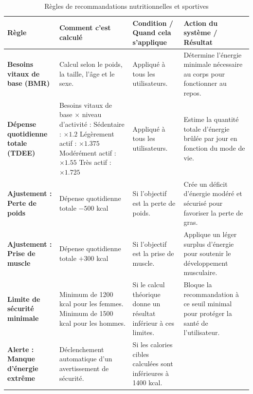 ﻿\documentclass[a4paper,12pt]{report}
\begin{document}
\begin{table}[H]
\sloppy
\centering
\caption{Règles de recommandations nutritionnelles et sportives}
\label{tab:regles_calcul_energetique_recommandations}
\scriptsize
\renewcommand{\arraystretch}{1.25}
\setlength{\tabcolsep}{3pt}
\begin{tabularx}{\textwidth}{|>{\RaggedRight\arraybackslash}p{2.8cm}|>{\RaggedRight\arraybackslash}p{4.1cm}|>{\RaggedRight\arraybackslash}p{3.2cm}|>{\RaggedRight\arraybackslash}X|}
\hline
\textbf{Règle} & \textbf{Comment c'est calculé} & \textbf{Condition / Quand cela s'applique} & \textbf{Action du système / Résultat} \\
\hline
\textbf{Besoins vitaux de base (BMR)} &
Calcul selon le poids, la taille, l'âge et le sexe. &
Appliqué à tous les utilisateurs. &
Détermine l'énergie minimale nécessaire au corps pour fonctionner au repos. \\
\hline
\textbf{Dépense quotidienne totale (TDEE)} &
Besoins vitaux de base $\times$ niveau d'activité :\newline
\textbullet{} Sédentaire : $\times 1.2$\newline
\textbullet{} Légèrement actif : $\times 1.375$\newline
\textbullet{} Modérément actif : $\times 1.55$\newline
\textbullet{} Très actif : $\times 1.725$ &
Appliqué à tous les utilisateurs. &
Estime la quantité totale d'énergie brûlée par jour en fonction du mode de vie. \\
\hline
\textbf{Ajustement : Perte de poids} &
Dépense quotidienne totale $- 500$ kcal &
Si l'objectif est la perte de poids. &
Crée un déficit d'énergie modéré et sécurisé pour favoriser la perte de gras. \\
\hline
\textbf{Ajustement : Prise de muscle} &
Dépense quotidienne totale $+ 300$ kcal &
Si l'objectif est la prise de muscle. &
Applique un léger surplus d'énergie pour soutenir le développement musculaire. \\
\hline
\textbf{Limite de sécurité minimale} &
Minimum de 1200 kcal pour les femmes.\newline
Minimum de 1500 kcal pour les hommes. &
Si le calcul théorique donne un résultat inférieur à ces limites. &
Bloque la recommandation à ce seuil minimal pour protéger la santé de l'utilisateur. \\
\hline
\textbf{Alerte : Manque d'énergie extrême} &
Déclenchement automatique d'un avertissement de sécurité. &
Si les calories cibles calculées sont inférieures à 1400 kcal. &

\end{tabularx}
\end{table}
\end{document}

